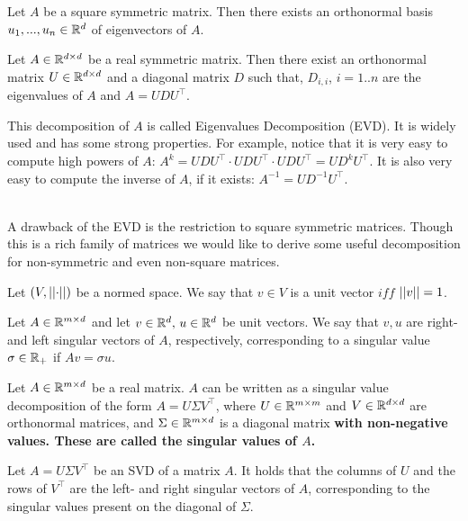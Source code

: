 \begin{claim}
Let $A$ be a square symmetric matrix. Then there exists an orthonormal basis $u_1,...,u_n\in\mathbb{R}^d$ of eigenvectors of $A$.
\end{claim}

\begin{theorem}[EVD]
Let $A\in \mathbb{R}^{d\times d}$ be a real symmetric matrix. Then there exist an orthonormal matrix $U\in \mathbb{R}^{d\times d}$ and a diagonal matrix $D$ such that, $D_{i,i}$, $i=1..n$ are the eigenvalues of $A$ and $A=UDU^\top$.
\end{theorem}

This decomposition of $A$ is called Eigenvalues Decomposition (EVD). It is widely used and has some strong properties. For example, notice that it is very easy to compute high powers of $A$: $A^k=UDU^\top\cdot UDU^\top\cdot UDU^\top=UD^kU^\top$. It is also very easy to compute the inverse of $A$, if it exists: $A^{-1}=UD^{-1}U^\top$. 

~\\A drawback of the EVD is the restriction to square symmetric matrices. Though this is a rich family of matrices we would like to derive some useful decomposition for non-symmetric and even non-square matrices.

\begin{definition}
Let $\left(V,\left|\left| \cdot\right|\right|\right)$ be a normed space. We say that $v\in V$ is a unit vector $iff$ $\left|\left| v\right|\right|=1$.
\end{definition}
\begin{definition}
Let $A\in\mathbb{R}^{m\times d}$ and let $v\in\mathbb{R}^d,\, u\in\mathbb{R}^d$ be unit vectors. We say that $v,u$ are right- and left singular vectors of $A$, respectively, corresponding to a singular value $\sigma\in\mathbb{R}_{+}$ if $Av=\sigma u$.
\end{definition}

\begin{theorem}
Let $A\in\mathbb{R}^{m\times d}$ be a real matrix. $A$ can be written as a singular value decomposition of the form $A=U\Sigma V^{\top}$, where $U\in \mathbb{R}^{m\times m}$ and $V\in\mathbb{R}^{d\times d}$ are orthonormal  matrices, and $\Sigma\in \mathbb{R}^{m\times d}$ is a diagonal matrix \bf{with non-negative values}. These are called the \textbf{singular values} of $A$.
\end{theorem}
\begin{claim}
Let $A=U\Sigma V^\top$ be an SVD of a matrix $A$. It holds that the columns of $U$ and the rows of $V^\top$ are the left- and right singular vectors of $A$, corresponding to the singular values present on the diagonal of $\Sigma$.
\end{claim}


